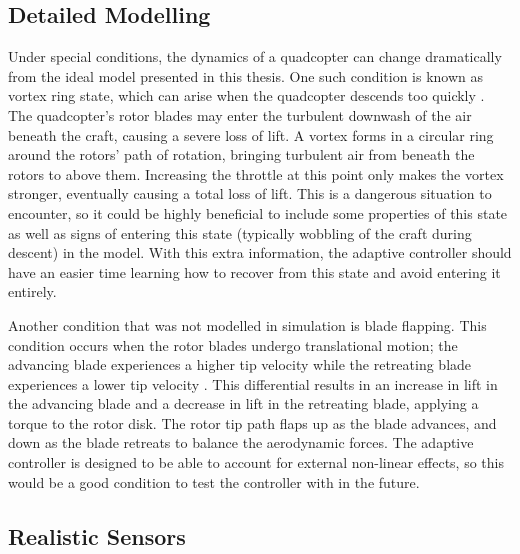\documentclass[letterpaper,12pt,titlepage,oneside,final]{book}
\begin{document}
\subsection{Detailed Modelling}

Under special conditions, the dynamics of a quadcopter can change dramatically from the ideal model presented in this thesis.
One such condition is known as vortex ring state, which can arise when the quadcopter descends too quickly \cite{vortexring}.
The quadcopter's rotor blades may enter the turbulent downwash of the air beneath the craft, causing a severe loss of lift.
A vortex forms in a circular ring around the rotors' path of rotation, bringing turbulent air from beneath the rotors to above them.
Increasing the throttle at this point only makes the vortex stronger, eventually causing a total loss of lift.
This is a dangerous situation to encounter, so it could be highly beneficial to include some properties of this state as well as signs of entering this state (typically wobbling of the craft during descent) in the model.
With this extra information, the adaptive controller should have an easier time learning how to recover from this state and avoid entering it entirely.

Another condition that was not modelled in simulation is blade flapping.
This condition occurs when the rotor blades undergo translational motion;
the advancing blade experiences a higher tip velocity while the retreating blade experiences a lower tip velocity \cite{bangura2012nonlinear}.
This differential results in an increase in lift in the advancing blade and a decrease in lift in the retreating blade, applying a torque to the rotor disk.
The rotor tip path flaps up as the blade advances, and down as the blade retreats to balance the aerodynamic forces.
The adaptive controller is designed to be able to account for external non-linear effects, so this would be a good condition to test the controller with in the future.


\subsection{Realistic Sensors}
\end{document}

